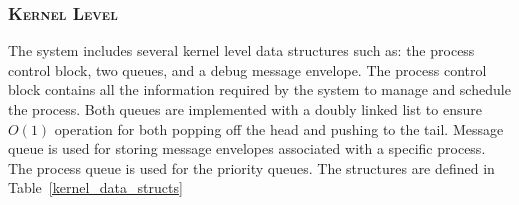 \documentclass[oneside]{report}
\begin{document}
\begin{table}[H]
    \caption{User Level Data Structure}
    \label{user_data_structs}
\end{table}

\subsubsection{\textsc{Kernel Level}}
The system includes several kernel level data structures such as: the process
control block, two queues, and a debug message envelope. The process control
block contains all the information required by the system to manage and
schedule the process. Both queues are implemented with a doubly linked list to
ensure $O(1)$ operation for both popping off the head and pushing to the tail.
Message queue is used for storing message envelopes associated with a specific
process. The process queue is used for the priority queues. The structures are
defined in Table~\ref{kernel_data_structs}
\end{document}
